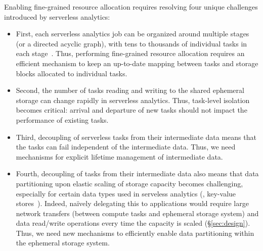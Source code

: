 Enabling fine-grained resource allocation requires resolving four unique challenges introduced by serverless analytics:

\begin{itemize}[leftmargin=*]
\itemsep0em
\item First, each serverless analytics job can be organized around multiple stages (or a directed acyclic graph), with tens to thousands of individual tasks in each stage~\cite{starling, locus, pocket, flint, sparkonlambda, cirrus, excamera, pywren, numpywren, gg, athena, aurora, azuresqldw, cloudburst, snowset}. Thus, performing fine-grained resource allocation requires an efficient mechanism to keep an up-to-date mapping between tasks and storage blocks allocated to individual tasks.
  
  \item Second, the number of tasks reading and writing to the shared ephemeral storage can change rapidly in serverless analytics. Thus, task-level isolation becomes critical: arrival and departure of new tasks should not impact the performance of existing tasks.

  \item Third, decoupling of serverless tasks from their intermediate data means that the tasks can fail independent of the intermediate data. Thus, we need mechanisms for explicit lifetime management of intermediate data.
  
  \item Fourth, decoupling of tasks from their intermediate data also means that data partitioning upon elastic scaling of storage capacity becomes challenging, especially for certain data types used in serveless analytics (\eg, key-value stores~\cite{pywren, locus, starling, gg, cirrus, cloudburst, pocket, starling}). Indeed, na\"ively delegating this to applications would require large network transfers (between compute tasks and ephemeral storage system) and data read/write operations every time the capacity is scaled (\S\ref{sec:design}). Thus, we need new mechanisms to efficiently enable data partitioning within the ephemeral storage system.
\end{itemize}

